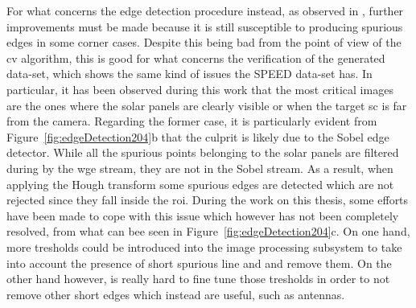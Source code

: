 For what concerns the edge detection procedure instead, as observed in \cite{Sharma2018}, further improvements must be made because it is still susceptible to producing spurious edges in some corner cases. Despite this being bad from the point of view of the \acrshort{cv} algorithm, this is good for what concerns the verification of the generated data-set, which shows the same kind of issues the SPEED data-set has. In particular, it has been observed during this work that the most critical images are the ones where the solar panels are clearly visible or when the target \acrshort{sc} is far from the camera. Regarding the former case, it is particularly evident from Figure~\ref{fig:edgeDetection204}b that the culprit is likely due to the Sobel edge detector. While all the spurious points belonging to the solar panels are filtered during by the \acrshort{wge} stream, they are not in the Sobel stream. As a result, when applying the Hough transform some spurious edges are detected which are not rejected since they fall inside the \acrshort{roi}. During the work on this thesis, some efforts have been made to cope with this issue which however has not been completely resolved, from what can bee seen in Figure~\ref{fig:edgeDetection204}c. On one hand, more tresholds could be introduced into the image processing subsystem to take into account the presence of short spurious line and and remove them. On the other hand however, is really hard to fine tune those tresholds in order to not remove other short edges which instead are useful, such as antennas.

